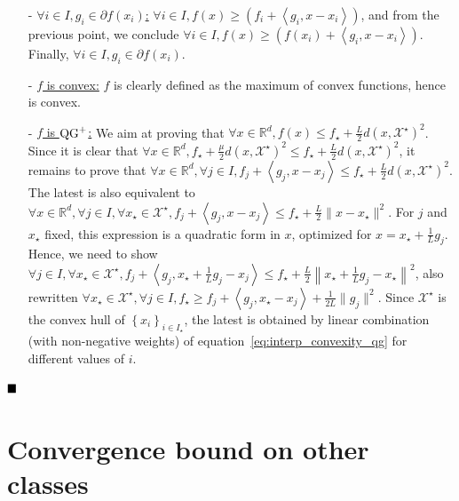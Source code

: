 \begin{itemize}
\begin{itemize}
                \item[-]\underline{$\forall i \in I, g_i \in \partial f(x_i)$:} $\forall i \in I, f(x) \geq \left( f_i + \left< g_i, x - x_i \right> \right)$, and from the previous point, we conclude $\forall i \in I, f(x) \geq \left( f(x_i) + \left< g_i, x - x_i \right> \right)$.
                Finally, $\forall i \in I, g_i \in \partial f(x_i)$.

                \item[-]\underline{$f$ is convex:} $f$ is clearly defined as the maximum of convex functions, hence is convex.

                \item[-]\underline{$f$ is $\operatorname{QG}^+$:} We aim at proving that $\forall x \in \mathbb{R}^d, f(x) \leq f_\star + \frac{L}{2}d\left(x, \mathcal{X}^\star \right)^2$.
                Since it is clear that $\forall x \in \mathbb{R}^d, f_\star + \frac{\mu}{2}d\left(x, \mathcal{X}^\star \right)^2 \leq f_\star + \frac{L}{2}d\left(x, \mathcal{X}^\star \right)^2$, it remains to prove that
                $\forall x \in \mathbb{R}^d, \forall j \in I, f_j + \left< g_j, x - x_j \right> \leq f_\star + \frac{L}{2}d\left(x, \mathcal{X}^\star \right)^2 $.
                The latest is also equivalent to $\forall x \in \mathbb{R}^d, \forall j \in I, \forall x_\star \in \mathcal{X}^\star, f_j + \left< g_j, x - x_j \right> \leq f_\star + \frac{L}{2}\| x - x_\star \|^2 $.
                For $j$ and $x_\star$ fixed, this expression is a quadratic form in $x$, optimized for $x = x_\star + \frac{1}{L}g_j$.
                Hence, we need to show $\forall j \in I, \forall x_\star \in \mathcal{X}^\star, f_j + \left< g_j, x_\star + \frac{1}{L}g_j - x_j \right> \leq f_\star + \frac{L}{2}\left\| x_\star + \frac{1}{L}g_j - x_\star \right\|^2 $, also rewritten $\forall x_\star \in \mathcal{X}^\star, \forall j \in I, f_\star \geq f_j + \left< g_j, x_\star - x_j \right> + \frac{1}{2L} \|g_j\|^2$.
                Since $\mathcal{X}^\star$ is the convex hull of $\left\{ x_i \right\}_{i \in I_\star}$, the latest is obtained by linear combination (with non-negative weights) of equation~\ref{eq:interp_convexity_qg} for different values of $i$.
            \end{itemize}
        \end{itemize}
    $\hfill\blacksquare$


\section{Convergence bound on other classes}
\label{apx:upper_assumption}

